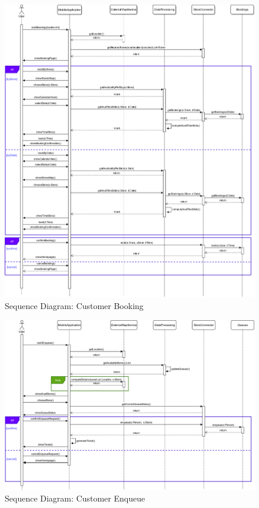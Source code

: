 \begin{figure}[H]
	\includegraphics[width=\linewidth]{../Diagrams/Sequence/sequence_customer_book.png}
	\caption{Sequence Diagram: Customer Booking}
	\label{fig:sCusBook}
\end{figure}

\begin{figure}[H]
	\includegraphics[width=\linewidth]{../Diagrams/Sequence/sequence_customer_enqueue.png}
	\caption{Sequence Diagram: Customer Enqueue}
	\label{fig:sCusEnq}
\end{figure}

